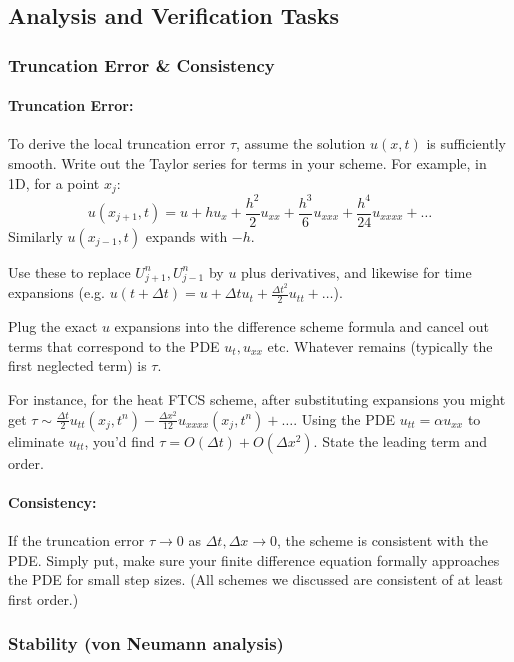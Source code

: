 \documentclass[a4paper,11pt]{article}
\begin{document}
\subsection{Analysis and Verification Tasks}

\subsubsection{Truncation Error \& Consistency}

\paragraph{Truncation Error:}
To derive the local truncation error $\tau$, assume the solution $u(x,t)$ is sufficiently smooth. Write out the Taylor series for terms in your scheme. For example, in 1D, for a point $x_j$:
$$u(x_{j+1}, t) = u + h u_x + \frac{h^2}{2}u_{xx} + \frac{h^3}{6}u_{xxx} + \frac{h^4}{24} u_{xxxx} + \ldots$$
Similarly $u(x_{j-1},t)$ expands with $-h$.

Use these to replace $U_{j+1}^n, U_{j-1}^n$ by $u$ plus derivatives, and likewise for time expansions (e.g. $u(t+\Delta t) = u + \Delta tu_t + \frac{\Delta t^2}{2}u_{tt} + \ldots$).

Plug the exact $u$ expansions into the difference scheme formula and cancel out terms that correspond to the PDE $u_{t}, u_{xx}$ etc. Whatever remains (typically the first neglected term) is $\tau$.

For instance, for the heat FTCS scheme, after substituting expansions you might get $\tau \sim \frac{\Delta t}{2}u_{tt}(x_j,t^n) - \frac{\Delta x^2}{12}u_{xxxx}(x_j,t^n) + \ldots$. Using the PDE $u_{tt} = \alpha u_{xx}$ to eliminate $u_{tt}$, you'd find $\tau = O(\Delta t) + O(\Delta x^2)$. State the leading term and order.

\paragraph{Consistency:} If the truncation error $\tau \to 0$ as $\Delta t, \Delta x \to 0$, the scheme is consistent with the PDE. Simply put, make sure your finite difference equation formally approaches the PDE for small step sizes. (All schemes we discussed are consistent of at least first order.)

\subsubsection{Stability (von Neumann analysis)}
\end{document}
